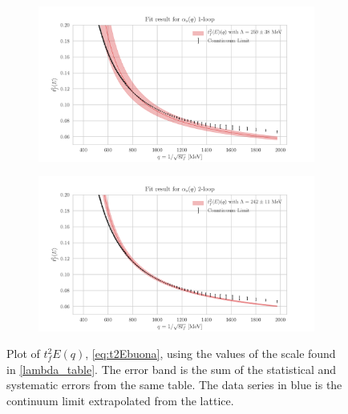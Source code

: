 \begin{figure}[hbt!]
    \centering
    \begin{subfigure}{0.7\textwidth}
        \centering
        \includegraphics[width=1\textwidth]{results/End1.pdf}
    \end{subfigure}
    \begin{subfigure}{0.7\textwidth}
        \centering
        \includegraphics[width=1\textwidth]{results/End2.pdf}
    \end{subfigure}

    \caption{Plot of $t_f^2E(q)$, \cref{eq:t2Ebuona}, using the values of the scale found in \cref{lambda_table}. The error band is the sum of the statistical and systematic errors from the same table. The data series in blue is the continuum limit extrapolated from the lattice.}
    \label{fig:end}
\end{figure}
